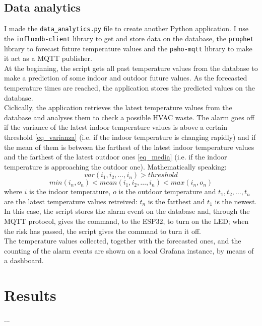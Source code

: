 \documentclass[conference]{IEEEtran}
\begin{document}
\subsection{Data analytics}
I made the \texttt{data\_analytics.py} file to create another Python application. I use the \texttt{influxdb-client} library to get and store data on the database, the \texttt{prophet} library to forecast future temperature values and the \texttt{paho-mqtt} library to make it act as a MQTT publisher.\\
At the beginning, the script gets all past temperature values from the database to make a prediction of some indoor and outdoor future values. As the forecasted temperature times are reached, the application stores the predicted values on the database.\\
Ciclically, the application retrieves the latest temperature values from the database and analyses them to check a possible HVAC waste. The alarm goes off if the variance of the latest indoor temperature values is above a certain threshold \eqref{eq_varianza} (i.e. if the indoor temperature is changing rapidly) and if the mean of them is between the farthest of the latest indoor temperature values and the farthest of the latest outdoor ones \eqref{eq_media} (i.e. if the indoor temperature is approaching the outdoor one). Mathematically speaking:
\begin{equation}
var(i_1, i_2, \dots, i_n) > threshold \label{eq_varianza}
\end{equation}
\begin{equation}
min(i_n, o_n) < mean(i_1, i_2, \dots, i_n) < max(i_n, o_n) \label{eq_media}
\end{equation}
where $i$ is the indoor temperature, $o$ is the outdoor temperature and $t_1, t_2, \dots, t_n$ are the latest temperature values retreived: $t_n$ is the farthest and $t_1$ is the newest. In this case, the script stores the alarm event on the database and, through the MQTT protocol, gives the command, to the ESP32, to turn on the LED; when the risk has passed, the script gives the command to turn it off.\\
The temperature values collected, together with the forecasted ones, and the counting of the alarm events are shown on a local Grafana instance, by means of a dashboard.


\section{Results}
...

\end{document}
